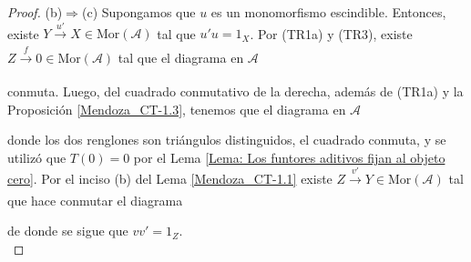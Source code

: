 \documentclass[tesis]{subfiles}
\begin{document}
\begin{proof}
    (b)$\Rightarrow$(c) Supongamos que $u$ es un monomorfismo escindible. Entonces, existe $Y\xrightarrow[]{u'}X\in\text{Mor}(\mathscr{A})$ tal que $u'u=1_X$. Por (TR1a) y (TR3), existe $Z\xrightarrow[]{f}0\in\text{Mor}(\mathscr{A})$ tal que el diagrama en $\mathscr{A}$
    \begin{center}
    \end{center}
    conmuta. Luego, del cuadrado conmutativo de la derecha, además de (TR1a) y la Proposición \ref{Mendoza_CT-1.3}, tenemos que el diagrama en $\mathscr{A}$
    \begin{center}
    \end{center}
    donde los dos renglones son triángulos distinguidos, el cuadrado conmuta, y se utilizó que $T(0)=0$ por el Lema \ref{Lema: Los funtores aditivos fijan al objeto cero}. Por el inciso (b) del Lema \ref{Mendoza_CT-1.1} existe $Z\xrightarrow[]{v'}Y\in\text{Mor}(\mathscr{A})$ tal que hace conmutar el diagrama
    \begin{center}
    \end{center}
    de donde se sigue que $vv'=1_Z$. \\


\end{proof}
\end{document}
